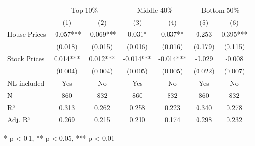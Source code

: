\begin{table}[h]
\fontsize{9.0pt}{10.8pt}\selectfont
\begin{tabular*}{\linewidth}{@{\extracolsep{\fill}}lcccccc}
\toprule
 & \multicolumn{2}{c}{Top 10\%} & \multicolumn{2}{c}{Middle 40\%} & \multicolumn{2}{c}{Bottom 50\%} \\ 
\cmidrule(lr){2-3} \cmidrule(lr){4-5} \cmidrule(lr){6-7}
  & (1) & (2) & (3) & (4) & (5) & (6) \\ 
\midrule\addlinespace[2.5pt]
House Prices & -0.057*** & -0.069*** & 0.031* & 0.037** & 0.253 & 0.395*** \\ 
 & (0.018) & (0.015) & (0.016) & (0.016) & (0.179) & (0.115) \\ 
Stock Prices & 0.014*** & 0.012*** & -0.014*** & -0.014*** & -0.029 & -0.008 \\ 
{} & {(0.004)} & {(0.004)} & {(0.005)} & {(0.005)} & {(0.022)} & {(0.007)} \\ 
\midrule
NL included & Yes & No & Yes & No & Yes & No \\ 
\midrule
{N} & {860} & {832} & {860} & {832} & {860} & {832} \\ 
R² & 0.313 & 0.262 & 0.258 & 0.223 & 0.340 & 0.278 \\ 
Adj. R² & 0.269 & 0.215 & 0.210 & 0.174 & 0.298 & 0.232 \\ 
\bottomrule
\end{tabular*}
\begin{minipage}{\linewidth}
* p < 0.1, ** p < 0.05, *** p < 0.01\\
\end{minipage}
\end{table}

